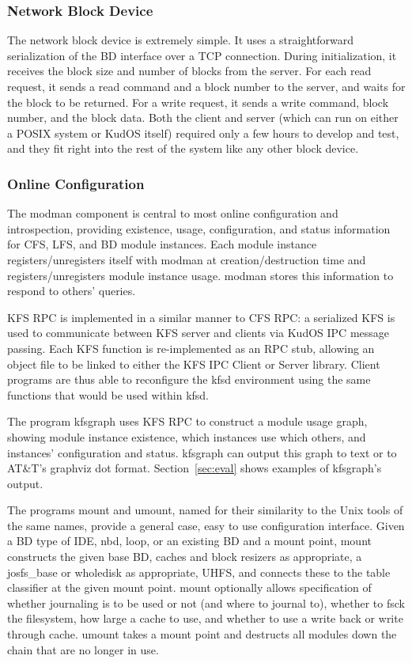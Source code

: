\subsubsection{Network Block Device}

The network block device is extremely simple. It uses a straightforward
serialization of the BD interface over a TCP connection. During initialization,
it receives the block size and number of blocks from the server. For each read
request, it sends a read command and a block number to the server, and waits for
the block to be returned. For a write request, it sends a write command, block
number, and the block data. Both the client and server (which can run on either
a POSIX system or KudOS itself) required only a few hours to develop and test,
and they fit right into the rest of the system like any other block device.

\subsubsection{Online Configuration}
\label{sec:solution:impl:online}

The modman component is central to most online configuration and introspection,
providing existence, usage, configuration, and status information for CFS, LFS,
and BD module instances. Each module instance registers/unregisters itself with
modman at creation/destruction time and registers/unregisters module instance
usage. modman stores this information to respond to others' queries.

KFS RPC is implemented in a similar manner to CFS RPC: a serialized KFS is used
to communicate between KFS server and clients via KudOS IPC message passing.
Each KFS function is re-implemented as an RPC stub, allowing an object file to
be linked to either the KFS IPC Client or Server library. Client programs are
thus able to reconfigure the kfsd environment using the same functions that
would be used within kfsd.

The program kfsgraph uses KFS RPC to construct a module usage graph, showing
module instance existence, which instances use which others, and instances'
configuration and status. kfsgraph can output this graph to text or to AT\&T's
graphviz dot format. Section~\ref{sec:eval} shows examples of kfsgraph's output.

The programs mount and umount, named for their similarity to the Unix tools of
the same names, provide a general case, easy to use configuration interface.
Given a BD type of IDE, nbd, loop, or an existing BD and a mount point, mount
constructs the given base BD, caches and block resizers as appropriate, a
josfs\_base or wholedisk as appropriate, UHFS, and connects these to the table
classifier at the given mount point. mount optionally allows specification of
whether journaling is to be used or not (and where to journal to), whether to
fsck the filesystem, how large a cache to use, and whether to use a write back
or write through cache. umount takes a mount point and destructs all modules
down the chain that are no longer in use.
